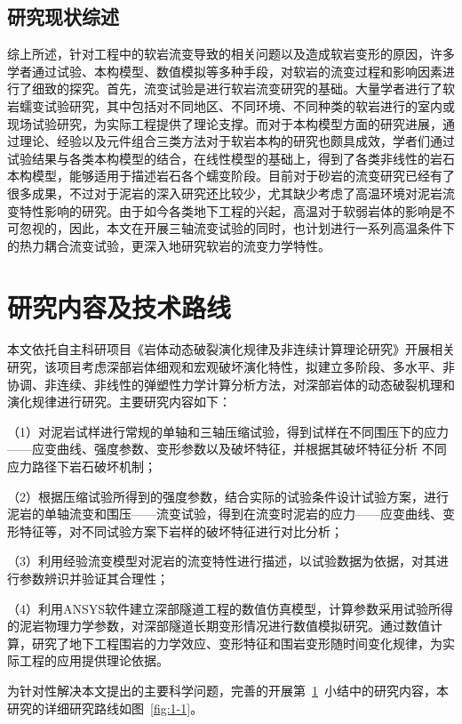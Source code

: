 \subsection{研究现状综述}
综上所述，针对工程中的软岩流变导致的相关问题以及造成软岩变形的原因，许多学者通过试验、本构模型、数值模拟等多种手段，对软岩的流变过程和影响因素进行了细致的探究。首先，流变试验是进行软岩流变研究的基础。大量学者进行了软岩蠕变试验研究，其中包括对不同地区、不同环境、不同种类的软岩进行的室内或现场试验研究，为实际工程提供了理论支撑。而对于本构模型方面的研究进展，通过理论、经验以及元件组合三类方法对于软岩本构的研究也颇具成效，学者们通过试验结果与各类本构模型的结合，在线性模型的基础上，得到了各类非线性的岩石本构模型，能够适用于描述岩石各个蠕变阶段。目前对于砂岩的流变研究已经有了很多成果，不过对于泥岩的深入研究还比较少，尤其缺少考虑了高温环境对泥岩流变特性影响的研究。由于如今各类地下工程的兴起，高温对于软弱岩体的影响是不可忽视的，因此，本文在开展三轴流变试验的同时，也计划进行一系列高温条件下的热力耦合流变试验，更深入地研究软岩的流变力学特性。




\section{研究内容及技术路线}\label{section:researchfocus}

本文依托自主科研项目《岩体动态破裂演化规律及非连续计算理论研究》开展相关研究，该项目考虑深部岩体细观和宏观破坏演化特性，拟建立多阶段、多水平、非协调、非连续、非线性的弹塑性力学计算分析方法，对深部岩体的动态破裂机理和演化规律进行研究。主要研究内容如下：

（1）对泥岩试样进行常规的单轴和三轴压缩试验，得到试样在不同围压下的应力——应变曲线、强度参数、变形参数以及破坏特征，并根据其破坏特征分析 不同应力路径下岩石破坏机制；

（2）根据压缩试验所得到的强度参数，结合实际的试验条件设计试验方案，进行泥岩的单轴流变和围压——流变试验，得到在流变时泥岩的应力——应变曲线、变形特征等，对不同试验方案下岩样的破坏特征进行对比分析；

（3）利用经验流变模型对泥岩的流变特性进行描述，以试验数据为依据，对其进行参数辨识并验证其合理性； 

（4）利用ANSYS软件建立深部隧道工程的数值仿真模型，计算参数采用试验所得的泥岩物理力学参数，对深部隧道长期变形情况进行数值模拟研究。通过数值计算，研究了地下工程围岩的力学效应、变形特征和围岩变形随时间变化规律，为实际工程的应用提供理论依据。

为针对性解决本文提出的主要科学问题，完善的开展第~\ref{section:researchfocus}~小结中的研究内容，本研究的详细研究路线如图~\ref{fig:1-1}。

